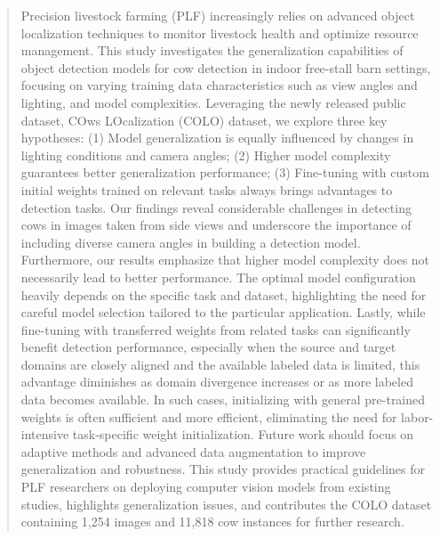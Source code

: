 \begin{abstract}

Precision livestock farming (PLF) increasingly relies on advanced object localization techniques to monitor livestock health and optimize resource management. This study investigates the generalization capabilities of object detection models for cow detection in indoor free-stall barn settings, focusing on varying training data characteristics such as view angles and lighting, and model complexities. Leveraging the newly released public dataset, COws LOcalization (COLO) dataset, we explore three key hypotheses: (1) Model generalization is equally influenced by changes in lighting conditions and camera angles; (2) Higher model complexity guarantees better generalization performance; (3) Fine-tuning with custom initial weights trained on relevant tasks always brings advantages to detection tasks. Our findings reveal considerable challenges in detecting cows in images taken from side views and underscore the importance of including diverse camera angles in building a detection model. Furthermore, our results emphasize that higher model complexity does not necessarily lead to better performance. The optimal model configuration heavily depends on the specific task and dataset, highlighting the need for careful model selection tailored to the particular application. Lastly, while fine-tuning with transferred weights from related tasks can significantly benefit detection performance, especially when the source and target domains are closely aligned and the available labeled data is limited, this advantage diminishes as domain divergence increases or as more labeled data becomes available. In such cases, initializing with general pre-trained weights is often sufficient and more efficient, eliminating the need for labor-intensive task-specific weight initialization. Future work should focus on adaptive methods and advanced data augmentation to improve generalization and robustness. This study provides practical guidelines for PLF researchers on deploying computer vision models from existing studies, highlights generalization issues, and contributes the COLO dataset containing 1,254 images and 11,818 cow instances for further research.

\end{abstract}

